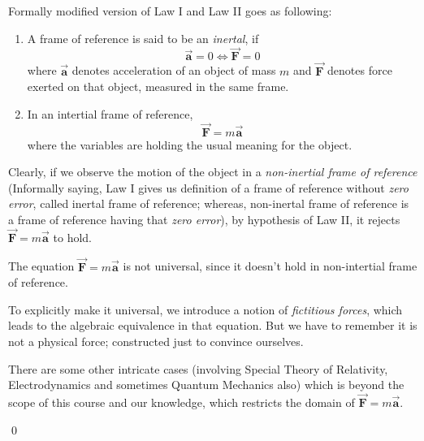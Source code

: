 \documentclass[11pt]{scrartcl}
\newcommand{\ve}[1]{\vec{\mathbf{#1}}}
\begin{document}
    \newpage 

    \begin{law}
        Formally modified version of Law I and Law II goes as following:
       \begin{enumerate}
           \item A frame of reference is said to be an \emph{inertal}, if \[\ve{a} = 0 \iff \ve{F} = 0\] where \(\ve{a}\) denotes acceleration of an object of mass \(m\) and \(\ve{F}\) denotes force exerted on that object, measured in the same frame.
           \item In an intertial frame of reference, \[\ve{F} = m\ve{a}\]where the variables are holding the usual meaning for the object.
       \end{enumerate} 
    \end{law}
    Clearly, if we observe the motion of the object in a \emph{non-inertial frame of reference} (Informally saying, Law I gives us  definition of a frame of reference without \emph{zero error}, called inertal frame of reference; whereas, non-inertal frame of reference is a frame of reference having that \emph{zero error}), by hypothesis of Law II, it rejects \(\ve{F} = m\ve{a}\) to hold.
    \begin{conclusion}
        The equation
        \(\ve{F} = m\ve{a}\) is not universal, since it doesn't hold in non-intertial frame of reference.
    \end{conclusion}
    To explicitly make it universal, we introduce a notion of \emph{fictitious forces}, which leads to the algebraic equivalence in that equation. But we have to remember it is not a physical force; constructed just to convince ourselves.

    There are some other intricate cases (involving Special Theory of Relativity, Electrodynamics and sometimes Quantum Mechanics also) which is beyond the scope of this course and our knowledge, which restricts the domain of \(\ve{F} = m\ve{a}\). 
    
    \qed
    
\end{document}
